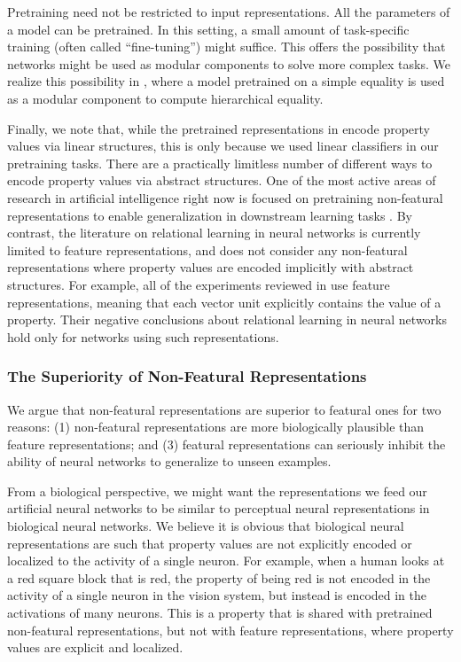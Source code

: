 \documentclass[9pt,twocolumn,twoside,lineno]{pnas-new}
\begin{document}
{Pretraining need not be restricted to input representations. All the parameters of a model can be pretrained. In this setting, a small amount of task-specific training (often called ``fine-tuning'') might suffice. This offers the possibility that networks might be used as modular components to solve more complex tasks. We realize this possibility in , where a model pretrained on a simple equality is used as a modular component to compute hierarchical equality.

Finally, we note that, while the pretrained representations in  encode property values via linear structures, this is only because we used linear classifiers in our pretraining tasks. There are a practically limitless number of different ways to encode property values via abstract structures. One of the most active areas of research in artificial intelligence right now is focused on pretraining non-featural representations to enable generalization in downstream learning tasks \citep{CollobertWeston:2011,Mikolov-etal:2013,pennington-socher-manning:2014:EMNLP2014,Peters-etal:2018,Devlin-etal:2019}. By contrast, the literature on relational learning in neural networks is currently limited to feature representations, and does not consider any non-featural representations where property values are encoded implicitly with abstract structures. For example, all of the experiments reviewed in \citep{alhama:2019} use feature representations, meaning that each vector unit explicitly contains the value of a property. Their negative conclusions about relational learning in neural networks hold only for networks using such representations.


\subsubsection{The Superiority of Non-Featural Representations}

We argue that non-featural representations are superior to featural ones for two reasons: (1) non-featural representations are more biologically plausible than feature representations; and (3) featural representations can seriously inhibit the ability of neural networks to generalize to unseen examples.

From a biological perspective, we might want the representations we feed our artificial neural networks to be similar to perceptual neural representations in biological neural networks. We believe it is obvious that biological neural representations are such that property values are not explicitly encoded or localized to the activity of a single neuron. For example, when a human looks at a red square block that is red, the property of being red is not encoded in the activity of a single neuron in the vision system, but instead is encoded in the activations of many neurons. This is a property that is shared with pretrained non-featural representations, but not with feature representations, where property values are explicit and localized.

}
\end{document}
